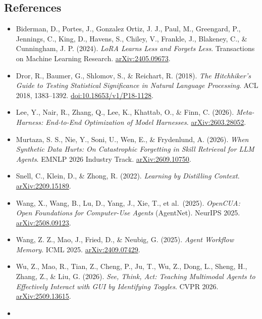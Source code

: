 \documentclass[
  10pt,
]{article}
\providecommand{\tightlist}{%
  \setlength{\itemsep}{0pt}\setlength{\parskip}{0pt}}
\begin{document}
\small

\subsection{References}\label{references}

\begin{itemize}
\tightlist
\item
  Biderman, D., Portes, J., Gonzalez Ortiz, J. J., Paul, M., Greengard,
  P., Jennings, C., King, D., Havens, S., Chiley, V., Frankle, J.,
  Blakeney, C., \& Cunningham, J. P. (2024). \emph{LoRA Learns Less and
  Forgets Less}. Transactions on Machine Learning Research.
  \href{https://arxiv.org/abs/2405.09673}{arXiv:2405.09673}.
\item
  Dror, R., Baumer, G., Shlomov, S., \& Reichart, R. (2018). \emph{The
  Hitchhiker's Guide to Testing Statistical Significance in Natural
  Language Processing}. ACL 2018, 1383--1392.
  \href{https://aclanthology.org/P18-1128/}{doi:10.18653/v1/P18-1128}.
\item
  Lee, Y., Nair, R., Zhang, Q., Lee, K., Khattab, O., \& Finn, C.
  (2026). \emph{Meta-Harness: End-to-End Optimization of Model
  Harnesses}. \href{https://arxiv.org/abs/2603.28052}{arXiv:2603.28052}.
\item
  Murtaza, S. S., Nie, Y., Soni, U., Wen, E., \& Frydenlund, A. (2026).
  \emph{When Synthetic Data Hurts: On Catastrophic Forgetting in Skill
  Retrieval for LLM Agents}. EMNLP 2026 Industry Track.
  \href{https://arxiv.org/abs/2609.10750}{arXiv:2609.10750}.
\item
  Snell, C., Klein, D., \& Zhong, R. (2022). \emph{Learning by
  Distilling Context}.
  \href{https://arxiv.org/abs/2209.15189}{arXiv:2209.15189}.
\item
  Wang, X., Wang, B., Lu, D., Yang, J., Xie, T., et al.~(2025).
  \emph{OpenCUA: Open Foundations for Computer-Use Agents} (AgentNet).
  NeurIPS 2025.
  \href{https://arxiv.org/abs/2508.09123}{arXiv:2508.09123}.
\item
  Wang, Z. Z., Mao, J., Fried, D., \& Neubig, G. (2025). \emph{Agent
  Workflow Memory}. ICML 2025.
  \href{https://arxiv.org/abs/2409.07429}{arXiv:2409.07429}.
\item
  Wu, Z., Mao, R., Tian, Z., Cheng, P., Ju, T., Wu, Z., Dong, L., Sheng,
  H., Zhang, Z., \& Liu, G. (2026). \emph{See, Think, Act: Teaching
  Multimodal Agents to Effectively Interact with GUI by Identifying
  Toggles}. CVPR 2026.
  \href{https://arxiv.org/abs/2509.13615}{arXiv:2509.13615}.
\item

\end{itemize}
\end{document}
